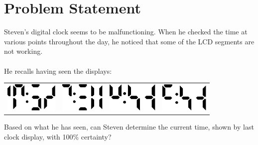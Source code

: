 \documentclass[a4paper,11pt,oneside]{article}
\begin{document}
\pagestyle{fancy}



\section{Problem Statement}

Steven's digital clock seems to be malfunctioning. When he checked the time at various
points throughout the day, he noticed that some of the LCD segments are not working.
\\\\
He recalls having seen the displays:
\begin{center}
\begin{tabularx}{7in}{X X X X}
\includegraphics[height=40pt]{./assets/testclock_1.eps}&
\includegraphics[height=40pt]{./assets/testclock_2.eps}&
\includegraphics[height=40pt]{./assets/testclock_3.eps}&
\includegraphics[height=40pt]{./assets/clock_4.eps}
\end{tabularx}
\end{center}
Based on what he has seen, can Steven determine the current time, shown by last clock display,
with 100\% certainty?
\end{document}
